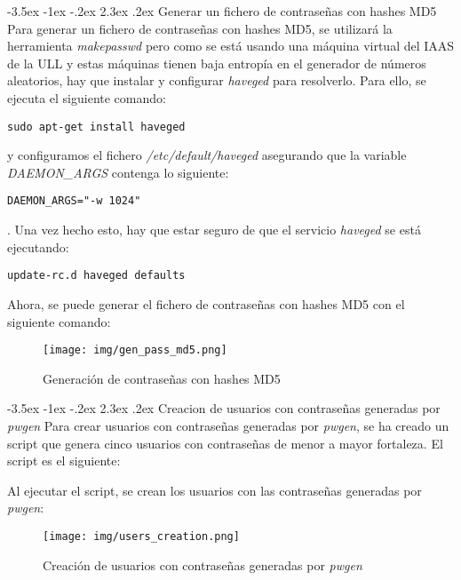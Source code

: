 \documentclass[11pt]{report}
\makeatletter
\renewcommand\chapter{\@startsection{chapter}{0}{\z@}%
    {-3.5ex \@plus -1ex \@minus -.2ex}%
    {2.3ex \@plus.2ex}%
    {\normalfont\Large\bfseries}}
\makeatother
\begin{document}
\chapter{Generar un fichero de contraseñas con hashes MD5}
Para generar un fichero de contraseñas con hashes MD5, se utilizará la herramienta \emph{makepasswd} pero 
como se está usando una máquina virtual del IAAS de la ULL y estas máquinas tienen
baja entropía en el generador de números aleatorios, hay que instalar y configurar \emph{haveged} para
resolverlo. Para ello, se ejecuta el siguiente comando:
\begin{BVerbatim}
sudo apt-get install haveged
\end{BVerbatim}
y configuramos el fichero \emph{/etc/default/haveged} asegurando que la variable \emph{DAEMON\_ARGS} 
contenga lo siguiente:
\begin{BVerbatim}
DAEMON_ARGS="-w 1024"
\end{BVerbatim}
. Una vez hecho esto, hay que estar seguro de que el servicio \emph{haveged} se está ejecutando:
\begin{BVerbatim}
update-rc.d haveged defaults
\end{BVerbatim}

Ahora, se puede generar el fichero de contraseñas con hashes MD5 con el siguiente comando:
\lstset{style=mystyle}


\begin{figure}[H]
  \centering
  \texttt{[image: img/gen\_pass\_md5.png]}
  \caption{Generación de contraseñas con hashes MD5}
  \label{fig:generación de contraseñas con hashes MD5}
\end{figure}

\cleardoublepage

\chapter{Creacion de usuarios con contraseñas generadas por \emph{pwgen}}
Para crear usuarios con contraseñas generadas por \emph{pwgen}, se ha creado un script que genera
cinco usuarios con contraseñas de menor a mayor fortaleza. El script es el siguiente:
\lstset{style=mystyle}


Al ejecutar el script, se crean los usuarios con las contraseñas generadas por \emph{pwgen}:
\begin{figure}[H]
  \centering
  \texttt{[image: img/users\_creation.png]}
  \caption{Creación de usuarios con contraseñas generadas por \emph{pwgen}}
  \label{fig:creación de usuarios con contraseñas generadas por pwgen}
\end{figure}
\end{document}
